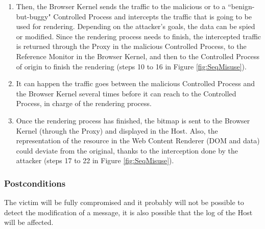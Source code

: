 \documentclass{sig-alternate-05-2015}
\begin{document}
\begin{enumerate}
        \item Then, the Browser Kernel sends the traffic to the malicious or to a ``benign-but-buggy" Controlled Process and intercepts the traffic that is going to be used for rendering. Depending on the attacker's goals, the data can be spied or modified. Since the rendering process needs to finish, the intercepted traffic is returned through the Proxy in the malicious Controlled Process, to the Reference Monitor in the Browser Kernel, and then to the Controlled Process of origin to finish the rendering (steps 10 to 16 in Figure \ref{fig:SeqMisuse}).
        \item It can happen the traffic goes between the malicious Controlled Process and the Browser Kernel several times before it can reach to the Controlled Process, in charge of the rendering process.
        \item Once the rendering process has finished, the bitmap is sent to the Browser Kernel (through the Proxy) and displayed in the Host. Also, the representation of the resource in the Web Content Renderer (DOM and data) could deviate from the original, thanks to the interception done by the attacker (steps 17 to 22 in Figure \ref{fig:SeqMisuse}).

      \end{enumerate}
  \subsubsection*{Postconditions} The victim will be fully compromised and it probably will not be possible to detect the modification of a message, it is also possible that the log of the Host will be affected.
\end{document}
